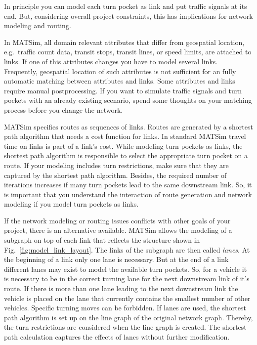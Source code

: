 In principle you can model each turn pocket as link and put traffic signals at its end. 
But, considering overall project constraints, this has implications for network modeling and routing. 

In MATSim, all domain relevant attributes that differ from geospatial location, e.g.~traffic count data, transit stops, transit lines, or speed limits, are attached to links. 
If one of this attributes changes you have to model several links. 
Frequently, geospatial location of such attributes is not sufficient for an fully automatic matching between attributes and links. 
Some attributes and links require manual postprocessing. 
If you want to simulate traffic signals and turn pockets with an already existing scenario, spend some thoughts on your matching process before you change the network.  

MATSim specifies routes as sequences of links. 
Routes are generated by a shortest path algorithm that needs a cost function for links. 
In standard MATSim travel time on links is part of a link's cost.
While modeling turn pockets as links, the shortest path algorithm is responsible to select the appropriate turn pocket on a route.
If your modeling includes turn restrictions, make sure that they are captured by the shortest path algorithm. 
Besides, the required number of iterations increases if many turn pockets lead to the same downstream link. 
So, it is important that you understand the interaction of route generation and network modeling if you model turn pockets as links. 

If the network modeling or routing issues conflicts with other goals of your project, there is an alternative available. 
MATSim allows the modeling of a subgraph on top of each link that reflects the structure shown in Fig.~\ref{fig:model_link_layout}. 
The links of the subgraph are then called \emph{lanes}. 
At the beginning of a link only one lane is necessary. 
But at the end of a link different lanes may exist to model the available turn pockets. 
So, for a vehicle it is necessary to be in the correct turning lane for the next downstream link of it's route.
If there is more than one lane leading to the next downstream link the vehicle is placed on the lane that currently contains the smallest number of other vehicles. %
Specific turning moves can be forbidden. 
If lanes are used, the shortest path algorithm is set up on the line graph of the original network graph.  
Thereby, the turn restrictions are considered when the line graph is created. 
The shortest path calculation captures the effects of lanes without further modification. 

